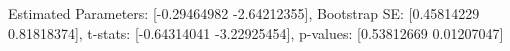 Estimated Parameters: [-0.29464982 -2.64212355], Bootstrap SE: [0.45814229 0.81818374], t-stats: [-0.64314041 -3.22925454], p-values: [0.53812669 0.01207047]